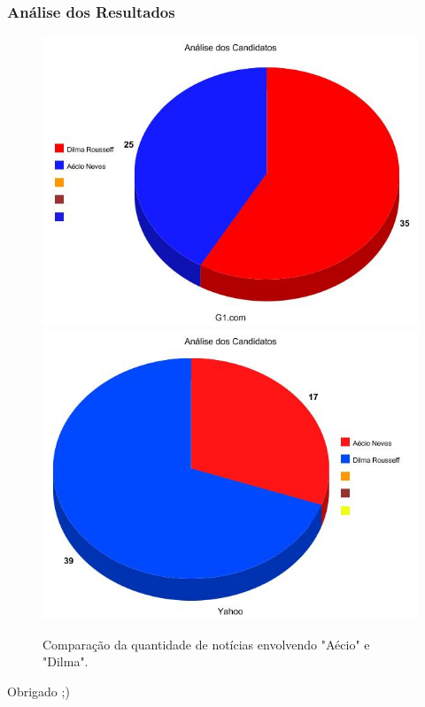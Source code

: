 
\begin{frame}[fragile]
\frametitle{Análise dos Resultados}
\begin{figure} 
\includegraphics[width=0.6\paperheight]{graph-g1.jpg} 
\includegraphics[width=0.6\paperheight]{graph-yahoo.jpg} 
\caption{Comparação da quantidade de notícias envolvendo "Aécio" e "Dilma".}
\end{figure}
\end{frame}


\begin{frame}
\Huge{\centerline{Obrigado ;)}}
\end{frame}



